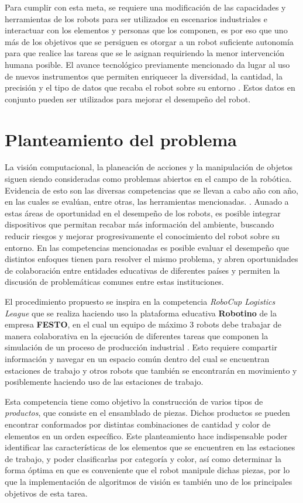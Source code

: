 Para cumplir con esta meta, se requiere una modificación de las capacidades y herramientas de los robots para ser utilizados en escenarios industriales e interactuar con los elementos y personas que los componen, es por eso que uno más de los objetivos que se persiguen es otorgar a un robot suficiente autonomía para que realice las tareas que se le asignan requiriendo la menor intervención humana posible. El avance tecnológico previamente mencionado da lugar al uso de nuevos instrumentos que permiten enriquecer la diversidad, la cantidad, la precisión y el tipo de datos que recaba el robot sobre su entorno \cite{basco_industria_2018}. Estos datos en conjunto pueden ser utilizados para mejorar el desempeño del robot.

\section{Planteamiento del problema}
La visión computacional, la planeación de acciones y la manipulación de objetos siguen siendo consideradas como problemas abiertos en el campo de la robótica. Evidencia de esto son las diversas competencias que se llevan a cabo año con año, en las cuales se evalúan, entre otras, las herramientas mencionadas. \cite{sun_research_2022}. Aunado a estas áreas de oportunidad en el desempeño de los robots, es posible integrar dispositivos que permitan recabar más información del ambiente, buscando reducir riesgos y mejorar progresivamente el conocimiento del robot sobre su entorno. En las competencias mencionadas es posible evaluar el desempeño que distintos enfoques tienen para resolver el mismo problema, y abren oportunidades de colaboración entre entidades educativas de diferentes países y permiten la discusión de problemáticas comunes entre estas instituciones.


El procedimiento propuesto se inspira en la competencia \textit{RoboCup Logistics League} que se realiza haciendo uso la plataforma educativa \textbf{Robotino} de la empresa \textbf{FESTO}, en el cual un equipo de máximo 3 robots debe trabajar de manera colaborativa en la ejecución de diferentes tareas que componen la simulación de un proceso de producción industrial \cite{robocup__mathworks_robocup_2022}. Esto requiere compartir información y navegar en un espacio común dentro del cual se encuentran estaciones de trabajo y otros robots que también se encontrarán en movimiento y posiblemente haciendo uso de las estaciones de trabajo.


Esta competencia tiene como objetivo la construcción de varios tipos de \textit{productos}, que consiste en el ensamblado de piezas. Dichos productos se pueden encontrar conformados por distintas combinaciones de cantidad y color de elementos en un orden específico. Este planteamiento hace indispensable poder identificar las características de los elementos que se encuentren en las estaciones de trabajo, y poder clasificarlas por categoría y color, así como determinar la forma óptima en que es conveniente que el robot manipule dichas piezas, por lo que la implementación de algoritmos de visión es también uno de los principales objetivos de esta tarea.

